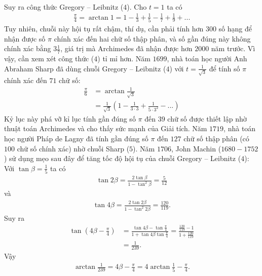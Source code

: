 \begin{multicols}{2}
\begin{align*}
	\end{align*}
	Suy ra công thức Gregory -- Leibnitz ($4$).
	\vskip 0.1cm 
	Cho $t = 1$  ta có
	\begin{align*}
		\frac{\pi }{4} = \arctan 1 = 1 - \frac{1}{3} + \frac{1}{5} - \frac{1}{7} + \frac{1}{9} + ...
	\end{align*}
	Tuy nhiên, chuỗi này hội tụ rất chậm, thí dụ, cần phải tính hơn $300$ số hạng để nhận được số $\pi$ chính xác đến hai chữ số thập phân, và số gần đúng này không chính xác bằng $3\frac{1}{7}$,  giá trị mà Archimedes đã nhận được hơn $2000$ năm trước.
	\vskip 0.1cm
	Vì vậy, cần xem xét công thức ($4$) tỉ mỉ hơn.
	\vskip 0.1cm
	Năm $1699$, nhà toán học người Anh Abraham Sharp đã dùng chuỗi Gregory -- Leibnitz ($4$) với $t = \frac{1}{\sqrt{3}}$ để tính số $\pi$ chính xác đến $71$ chữ số:
	\begin{align*}
		\frac{\pi }{6} &= \arctan \frac{1}{{\sqrt 3 }} \\
		&= \frac{1}{{\sqrt 3 }}\left( {1 - \frac{1}{{3 \cdot 3}} + \frac{1}{{5 \cdot {3^2}}} - ...} \right) \tag{$5$}
	\end{align*}
	Kỷ lục này phá vỡ kỉ lục tính gần đúng số $\pi$ đến $39$ chữ số được thiết lập nhờ thuật toán Archimedes và cho thấy sức mạnh của Giải tích.   
	\vskip 0.1cm
	Năm $1719$, nhà toán học người Pháp de Lagny đã tính gần đúng số $\pi$ đến $127$ chữ số thập phân (có $100$ chữ số chính xác) nhờ chuỗi Sharp ($5$).
	\vskip 0.1cm 
	Năm $1706$, John Machin ($1680-1752$) sử dụng mẹo sau đây để tăng tốc độ hội tụ của chuỗi Gregory -- Leibnitz ($4$): Với $\tan \beta = \frac{1}{5}$ ta có 
	\begin{align*}
		\tan 2\beta  = \frac{{2\tan \beta }}{{1 - {{\tan }^2}\beta }} = \frac{5}{{12}}
	\end{align*}
	và 
	\begin{align*}
		\tan 4\beta  = \frac{{2\tan 2\beta }}{{1 - {{\tan }^2}2\beta }} = \frac{{120}}{{119}}.
	\end{align*}
	Suy ra 
	\begin{align*}
		\tan \left( {4\beta  - \frac{\pi }{4}} \right) &= \frac{{\tan 4\beta  - \tan \frac{\pi }{4}}}{{1 + \tan 4\beta \tan \frac{\pi }{4}}} = \frac{{\frac{{120}}{{119}} - 1}}{{1 + \frac{{120}}{{119}}}} \\
		&= \frac{1}{{239}}.
	\end{align*}
	Vậy 
	\begin{align*}
		\arctan \frac{1}{{239}} = 4\beta  - \frac{\pi }{4} = 4\arctan \frac{1}{5} - \frac{\pi }{4}.
	\end{align*}

\end{multicols}
